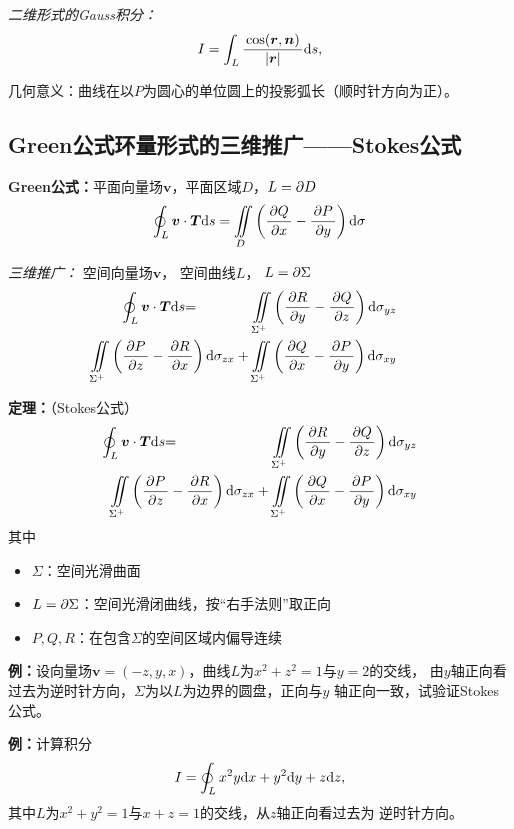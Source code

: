 {\it 二维形式的Gauss积分：}
$$I=\int_L\displaystyle\frac{\,{\cos(\bm{r},\bm{n})}\,}{\,{|\bm{r}|}\,}\mathrm{d} s,$$

几何意义：曲线在以$P$为圆心的单位圆上的投影弧长（顺时针方向为正）。

\subsection{Green公式环量形式的三维推广——Stokes公式}

{\bf Green公式：}平面向量场$\bm{v}$，平面区域$D$，$L=\partial D$ 
$${\oint_L\bm{v}\cdot\bm{T}\mathrm{d} s=\iint\limits_D
\left(\displaystyle\frac{\,{\partial Q}\,}{\,{\partial x}\,}-\displaystyle\frac{\,{\partial P}\,}{\,{\partial y}\,}\right)\mathrm{d}\sigma}$$
 
{\it 三维推广：} 空间向量场$\bm{v}$， 空间曲线$L$， $L=\partial\Sigma$ 
\begin{eqnarray*}
	{\ds\oint_L\bm{v}\cdot\bm{T}\d s}&{=}&
	{\ds\iint\limits_{\Sigma^+}\left(\df{\p R}{\p y}-\df{\p Q}{\p
	z}\right)\d\sigma_{yz}}\\ 
	&& {\hspace{-3cm}\ds\iint\limits_{\Sigma^+}\left(\df{\p P}{\p
	z}-\df{\p R}{\p x}\right)\d\sigma_{zx}
	+\iint\limits_{\Sigma^+}\left(\df{\p Q}{\p x}-\df{\p P}{\p
	y}\right)\d\sigma_{xy}}
\end{eqnarray*}

{\bf 定理：}（Stokes公式）
\begin{eqnarray*}
	{\ds\oint_L\bm{v}\cdot\bm{T}\d s}&{=}&
	{\ds\iint\limits_{\Sigma^+}\left(\df{\p R}{\p y}-\df{\p Q}{\p
	z}\right)\d\sigma_{yz}}\\ 
	&& {\hspace{-2cm}\ds\iint\limits_{\Sigma^+}\left(\df{\p P}{\p
	z}-\df{\p R}{\p x}\right)\d\sigma_{zx}
	+\iint\limits_{\Sigma^+}\left(\df{\p Q}{\p x}-\df{\p P}{\p
	y}\right)\d\sigma_{xy}}
\end{eqnarray*}
其中
\begin{itemize}
  \item {$\Sigma$：}空间光滑曲面
  \item {$L=\partial\Sigma$：}空间光滑闭曲线，按{“右手法则”}取正向
  \item {$P,Q,R$：}在包含$\Sigma$的空间区域内偏导连续
\end{itemize}

{\bf 例：}设向量场$\bm{v}=(-z,y,x)$，曲线$L$为$x^2+z^2=1$与$y=2$的交线，
由$y$轴正向看过去为逆时针方向，$\Sigma$为以$L$为边界的圆盘，正向与$y$
轴正向一致，试验证Stokes公式。

{\bf 例：}计算积分
$$I=\oint_Lx^2y\mathrm{d} x+y^2\mathrm{d} y+z\mathrm{d} z,$$
其中$L$为$x^2+y^2=1$与$x+z=1$的交线，从$z$轴正向看过去为
逆时针方向。

